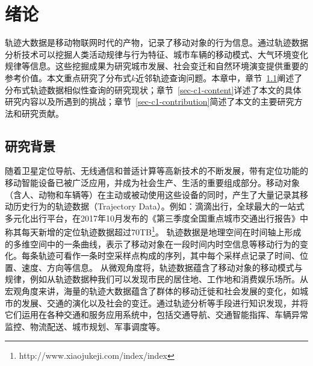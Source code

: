 \chapter{绪论}\label{capater:intro}
轨迹大数据是移动物联网时代的产物，记录了移动对象的行为信息。通过轨迹数据分析技术可以挖掘人类活动规律与行为特征、城市车辆的移动模式、大气环境变化规律等信息。这些挖掘成果为研究城市发展、社会变迁和自然环境演变提供重要的参考价值。本文重点研究了分布式$k$近邻轨迹查询问题。本章中，章节~\ref{sec-c1-background}阐述了分布式轨迹数据相似性查询的研究现状；章节~\ref{sec-c1-content}详述了本文的具体研究内容以及所遇到的挑战；章节~\ref{sec-c1-contribution}简述了本文的主要研究方法和研究贡献。

\section{研究背景}\label{sec-c1-background}
        随着卫星定位导航、无线通信和普适计算等高新技术的不断发展，带有定位功能的移动智能设备已被广泛应用，并成为社会生产、生活的重要组成部分。移动对象（含人、动物和车辆等）在主动或被动使用这些设备的同时，产生了大量记录其移动历史行为的轨迹数据（Trajectory Data）。例如：滴滴出行，全球最大的一站式多元化出行平台，在2017年10月发布的《第三季度全国重点城市交通出行报告》中称其每天新增的定位轨迹数据超过70TB\footnote{http://www.xiaojukeji.com/index/index}。
            轨迹数据是地理空间在时间轴上形成的多维空间中的一条曲线，表示了移动对象在一段时间内时空信息等移动行为的变化。每条轨迹可看作一条时空采样点构成的序列，其中每个采样点记录了时间、位置、速度、方向等信息。 从微观角度将，轨迹数据蕴含了移动对象的移动模式与规律\cite{Gonz2008Understanding,Song2010Limits,LiDHKN10}，例如从轨迹数据种我们可以发现市民的居住地、工作地和消费娱乐场所\cite{zzgSF}。从宏观角度来讲，海量的轨迹大数据蕴含了群体的移动迁徙和社会发展的变化，如城市的发展、交通的演化以及社会的变迁\cite{Zheng15}。通过轨迹分析等手段进行知识发现，并将它们运用在各种交通和服务应用系统中，包括交通导航\cite{QSJPredict,QSJProjection}、交通智能指挥\cite{LXX}、车辆异常监控\cite{CJY,MJLSoftware}、物流配送、城市规划、军事调度等\cite{QGD,XJJZXF,GQSurvery}。
        
